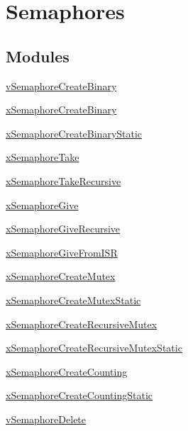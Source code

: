 \hypertarget{group___semaphores}{}\section{Semaphores}
\label{group___semaphores}
\subsection*{Modules}
\begin{DoxyCompactItemize}
\item 
\hyperlink{group__v_semaphore_create_binary}{v\+Semaphore\+Create\+Binary}
\item 
\hyperlink{group__x_semaphore_create_binary}{x\+Semaphore\+Create\+Binary}
\item 
\hyperlink{group__x_semaphore_create_binary_static}{x\+Semaphore\+Create\+Binary\+Static}
\item 
\hyperlink{group__x_semaphore_take}{x\+Semaphore\+Take}
\item 
\hyperlink{group__x_semaphore_take_recursive}{x\+Semaphore\+Take\+Recursive}
\item 
\hyperlink{group__x_semaphore_give}{x\+Semaphore\+Give}
\item 
\hyperlink{group__x_semaphore_give_recursive}{x\+Semaphore\+Give\+Recursive}
\item 
\hyperlink{group__x_semaphore_give_from_i_s_r}{x\+Semaphore\+Give\+From\+I\+SR}
\item 
\hyperlink{group__x_semaphore_create_mutex}{x\+Semaphore\+Create\+Mutex}
\item 
\hyperlink{group__x_semaphore_create_mutex_static}{x\+Semaphore\+Create\+Mutex\+Static}
\item 
\hyperlink{group__x_semaphore_create_recursive_mutex}{x\+Semaphore\+Create\+Recursive\+Mutex}
\item 
\hyperlink{group__x_semaphore_create_recursive_mutex_static}{x\+Semaphore\+Create\+Recursive\+Mutex\+Static}
\item 
\hyperlink{group__x_semaphore_create_counting}{x\+Semaphore\+Create\+Counting}
\item 
\hyperlink{group__x_semaphore_create_counting_static}{x\+Semaphore\+Create\+Counting\+Static}
\item 
\hyperlink{group__v_semaphore_delete}{v\+Semaphore\+Delete}
\end{DoxyCompactItemize}
